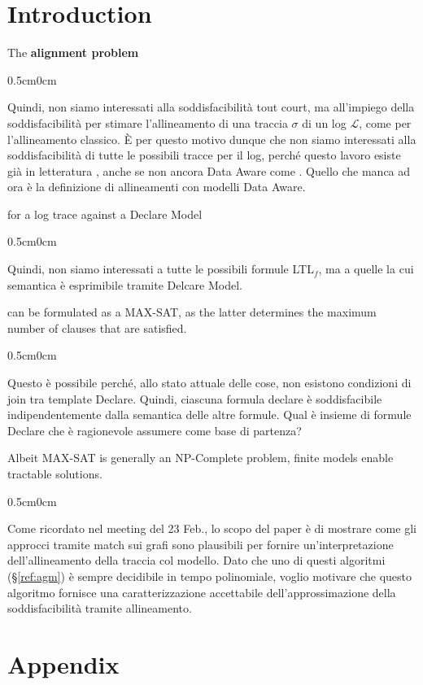 \documentclass[runningheads]{llncs}
\newlength{\previousLine}
\newenvironment{UnknownEnvironment}
{%
	\setlength{\previousLine}{\linewidth}%
	\addtolength{\previousLine}{-\linegoal}
	\par\bigskip%
	\bfseries%
	\begin{adjustwidth}{0.5cm}{0cm}%
	}
	{%
	\end{adjustwidth}
	\par\bigskip%
	\hspace*{\previousLine}%
}
\begin{document}

\section{Introduction}


The \textbf{\color{blue}alignment problem}
\begin{UnknownEnvironment}
	Quindi, non siamo interessati alla soddisfacibilità tout court, ma all'impiego della soddisfacibilità per stimare l'allineamento di una traccia $\sigma$ di un log $\mathcal{L}$, come per l'allineamento classico. {\color{blue}È per questo motivo dunque che non siamo interessati alla soddisfacibilità di tutte le possibili tracce per il log, perché questo lavoro esiste già in letteratura \cite{LiPZVR20}, anche se non ancora Data Aware come \cite{8944989}. Quello che manca ad ora è la definizione di allineamenti con modelli Data Aware.}
\end{UnknownEnvironment}
for a log trace against a Declare Model 
\begin{UnknownEnvironment}
Quindi, non siamo interessati a tutte le possibili formule LTL$_f$, ma a quelle la cui semantica è esprimibile tramite Delcare Model.
\end{UnknownEnvironment}
can be formulated as a MAX-SAT, as the latter determines the maximum number of clauses  that are satisfied. 
\begin{UnknownEnvironment}
	Questo è possibile perché, allo stato attuale delle cose, non esistono condizioni di join tra template Declare. Quindi,
	ciascuna formula declare è soddisfacibile indipendentemente dalla semantica delle altre formule. {\color{red}Qual è insieme di formule Declare che è ragionevole assumere come base di partenza?}
\end{UnknownEnvironment}
Albeit MAX-SAT is generally an NP-Complete problem, finite models enable tractable solutions.
\begin{UnknownEnvironment}
	\color{blue}Come ricordato nel meeting del 23 Feb., lo scopo del paper è di mostrare come gli approcci tramite match sui grafi sono plausibili per fornire un'interpretazione dell'allineamento della traccia col modello. Dato che uno di questi algoritmi (\S\ref{ref:agm}) è sempre decidibile in tempo polinomiale, voglio motivare che questo algoritmo fornisce una caratterizzazione accettabile dell'approssimazione della soddisfacibilità tramite allineamento.
\end{UnknownEnvironment}



%
%
%
%






\appendix 


\renewcommand{\thelemma}{\thesection\arabic{lemma}}

\section{Appendix}
\end{document}
